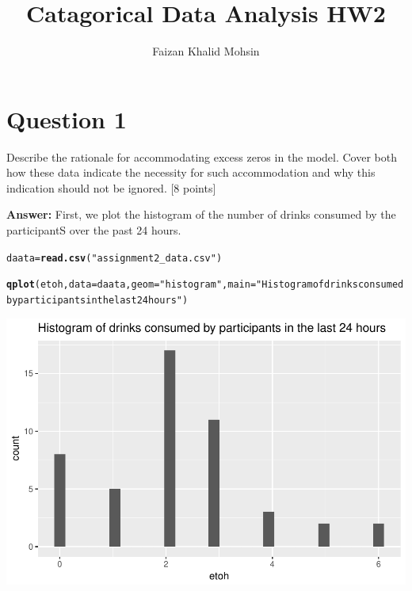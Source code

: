 \documentclass{article}\usepackage[]{graphicx}\usepackage[]{color}
\title{Catagorical Data Analysis HW2}
\author{Faizan Khalid Mohsin}
\makeatletter
\def\maxwidth{ %
  \ifdim\Gin@nat@width>\linewidth
    \linewidth
  \else
    \Gin@nat@width
  \fi
}
\newcommand{\hlstr}[1]{\textcolor[rgb]{0.192,0.494,0.8}{#1}}%
\newcommand{\hlstd}[1]{\textcolor[rgb]{0.345,0.345,0.345}{#1}}%
\newcommand{\hlkwb}[1]{\textcolor[rgb]{0.69,0.353,0.396}{#1}}%
\newcommand{\hlkwc}[1]{\textcolor[rgb]{0.333,0.667,0.333}{#1}}%
\newcommand{\hlkwd}[1]{\textcolor[rgb]{0.737,0.353,0.396}{\textbf{#1}}}%
\newenvironment{kframe}{%
 \def\at@end@of@kframe{}%
 \ifinner\ifhmode%
  \def\at@end@of@kframe{\end{minipage}}%
  \begin{minipage}{\columnwidth}%
 \fi\fi%
 \def\FrameCommand##1{\hskip\@totalleftmargin \hskip-\fboxsep
 \colorbox{shadecolor}{##1}\hskip-\fboxsep
     \hskip-\linewidth \hskip-\@totalleftmargin \hskip\columnwidth}%
 \MakeFramed {\advance\hsize-\width
   \@totalleftmargin\z@ \linewidth\hsize
   \@setminipage}}%
 {\par\unskip\endMakeFramed%
 \at@end@of@kframe}
\newenvironment{knitrout}{}{} %
\makeatother
\begin{document}
\maketitle






\section*{Question 1}
Describe the rationale for accommodating excess zeros in the model. Cover
both how these data indicate the necessity for such accommodation and why
this indication should not be ignored. [8 points]

\vspace{5mm}

{\bf Answer:} First, we plot the histogram of the number of drinks consumed by the participantS over the past 24 hours. 

\begin{knitrout}
\color{fgcolor}\begin{kframe}
\begin{alltt}
\hlstd{daata} \hlkwb{=} \hlkwd{read.csv}\hlstd{(}\hlstr{"assignment2_data.csv"}\hlstd{)}

\hlkwd{qplot}\hlstd{(etoh,} \hlkwc{data}\hlstd{=daata,} \hlkwc{geom}\hlstd{=}\hlstr{"histogram"}\hlstd{,} \hlkwc{main} \hlstd{=} \hlstr{"Histogram of drinks consumed by participants in the last 24 hours"}\hlstd{)}
\end{alltt}
\end{kframe}

{\centering \includegraphics[width=\maxwidth]{figure/unnamed-chunk-2-1} 

}



\end{knitrout}
\end{document}
